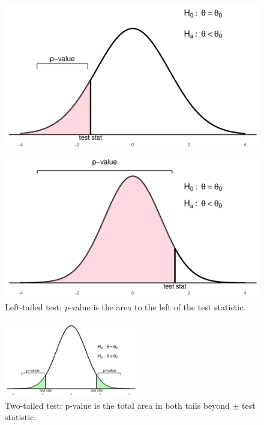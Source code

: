 \begin{figure}[H]
  \centering
  \begin{minipage}{0.48\textwidth}
    \centering
    \includegraphics[width=\textwidth]{section11/images/hypothesis_left_tail.pdf}
  \end{minipage}
  \hfill
  \begin{minipage}{0.48\textwidth}
    \centering
    \includegraphics[width=\textwidth]{section11/images/hypothesis_left_tail_wide.pdf}
  \end{minipage}
\caption*{Left-tailed test: \textit{p}-value is the area to the left of the test statistic.}
\end{figure}

\begin{figure}[H]
  \centering
  \includegraphics[width=0.52\textwidth]{section11/images/hypothesis_two_tail.pdf}
  \caption*{Two-tailed test: p-value is the total area in both tails beyond $\pm$ test statistic.}
\end{figure}
